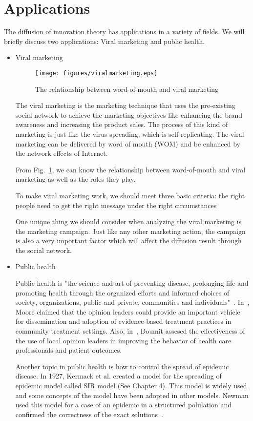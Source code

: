 \section{Applications}
The diffusion of innovation theory has applications in a variety of fields. We will briefly discuss two applications: Viral marketing and public health.
\begin{itemize}

\item {Viral marketing}

\begin{figure}[!htb]
  \centering
  \texttt{[image: figures/viralmarketing.eps]}
  \caption{The relationship between word-of-mouth and viral marketing ~\cite{kaplan2011two}}
  \label{fig:relationwm}
\end{figure}

The viral marketing is the marketing technique that uses the pre-existing social network to achieve the marketing objectives like enhancing the brand awareness and increasing the product sales. The process of this kind of marketing is just like the virus spreading, which is self-replicating. The viral marketing can be delivered by word of mouth (WOM) and be enhanced by the network effects of Internet. 

From Fig.~\ref{fig:relationwm}, we can know the relationship between word-of-mouth and viral marketing as well as the roles they play. 
 
To make viral marketing work, we should meet three basic criteria:  the right people need to get the right message under the right circumstances~\cite{kaplan2011two}

One unique thing we should consider when analyzing the viral marketing is the marketing campaign. Just like any other marketing action, the campaign is also a very important factor which will affect the diffusion result through the social network.

\item Public health

Public health is "the science and art of preventing disease, prolonging life and promoting health through the organized efforts and informed choices of society, organizations, public and private, communities and individuals"~\cite{winslow1920untilled}. In~\cite{moore2004characteristics}, Moore claimed that the opinion leaders could provide an important vehicle for dissemination and adoption of evidence-based treatment practices in community treatment settings. Also, in~\cite{doumit2007local}, Doumit assesed the effectiveness of the use of local opinion leaders in improving the behavior of health care professionals and patient outcomes. 

Another topic in public health is how to control the spread of epidemic disease. In 1927, Kermack et al. created a model for the spreading of epidemic model called SIR model (See Chapter 4). This model is widely used and some concepts of the model have been adopted in other models. Newman used this model for a case of an epidemic in a structured polulation and confirmed the correctness of the exact solutions~\cite{newman2002spread}.

\end{itemize}
